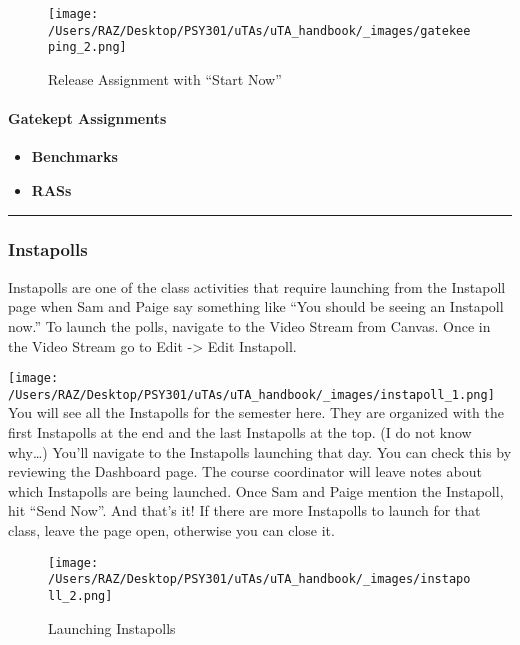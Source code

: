 \documentclass[
]{article}
\providecommand{\tightlist}{%
  \setlength{\itemsep}{0pt}\setlength{\parskip}{0pt}}
\begin{document}
\begin{figure}
\centering
\texttt{[image: /Users/RAZ/Desktop/PSY301/uTAs/uTA\_handbook/\_images/gatekeeping\_2.png]}
\caption{Release Assignment with ``Start Now''}
\end{figure}

\hypertarget{gatekept-assignments}{%
\paragraph{Gatekept Assignments}\label{gatekept-assignments}}

\begin{itemize}
\tightlist
\item
  \textbf{Benchmarks}
\item
  \textbf{RASs}
\end{itemize}

\begin{center}\rule{0.5\linewidth}{0.5pt}\end{center}

\hypertarget{instapolls}{%
\subsubsection{Instapolls}\label{instapolls}}

Instapolls are one of the class activities that require launching from the Instapoll page when Sam and Paige say something like ``You should be seeing an Instapoll now.'' To launch the polls, navigate to the Video Stream from Canvas. Once in the Video Stream go to Edit -\textgreater{} Edit Instapoll.

\texttt{[image: /Users/RAZ/Desktop/PSY301/uTAs/uTA\_handbook/\_images/instapoll\_1.png]}
You will see all the Instapolls for the semester here. They are organized with the first Instapolls at the end and the last Instapolls at the top. (I do not know why\ldots) You'll navigate to the Instapolls launching that day. You can check this by reviewing the Dashboard page. The course coordinator will leave notes about which Instapolls are being launched. Once Sam and Paige mention the Instapoll, hit ``Send Now''. And that's it! If there are more Instapolls to launch for that class, leave the page open, otherwise you can close it.

\begin{figure}
\centering
\texttt{[image: /Users/RAZ/Desktop/PSY301/uTAs/uTA\_handbook/\_images/instapoll\_2.png]}
\caption{Launching Instapolls}
\end{figure}
\end{document}
